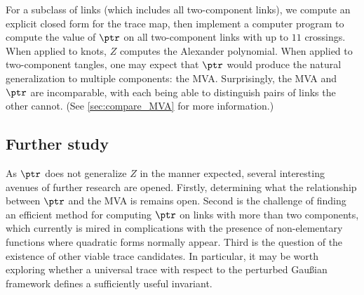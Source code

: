 For a subclass of links (which includes all two-component links), we compute an
explicit closed form for the trace map, then implement a computer program to
compute the value of $\ptr$ on all two-component links with up to $11$
crossings. When applied to knots, $Z$ computes the Alexander
polynomial. When applied to two-component
tangles, one may expect that $\ptr$ would produce the natural generalization to
multiple components: the \ac{MVA}. Surprisingly, the \ac{MVA} and $\ptr$ are
incomparable, with each being able to distinguish pairs of links the other
cannot. (See \cref{sec:compare_MVA} for more information.)

\subsection{Further study}
As $\ptr$ does not generalize $Z$ in the manner expected, several interesting
avenues of further research are opened. Firstly, determining what the
relationship between $\ptr$ and the \ac{MVA} is remains open. Second is the
challenge of finding an efficient method for computing $\ptr$ on links with more
than two components, which currently is mired in complications with
the presence of non-elementary functions where quadratic forms normally appear.
Third is the question of the existence of other viable trace candidates. In
particular, it may be worth exploring whether a universal trace with respect to
the perturbed Gaußian framework defines a sufficiently useful invariant.
